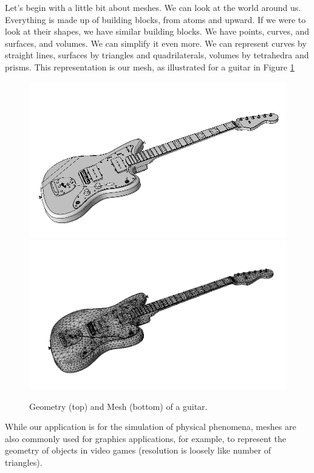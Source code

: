 \documentclass[12pt]{article}
\begin{document}
\maketitle

Let's begin with a little bit about meshes. We can look at the world around us.
Everything is made up of building blocks, from atoms and upward. If we were to
look at their shapes, we have similar building blocks. We have points, curves,
and surfaces, and volumes. We can simplify it even more. We can represent curves
by straight lines, surfaces by triangles and quadrilaterals, volumes by
tetrahedra and prisms. This representation is our mesh, as illustrated for a
guitar in Figure \ref{fig:guitar}
\begin{figure}
\includegraphics[width=1.0\textwidth]{images/guitarCAD.png}\\\includegraphics[width=1.0\textwidth]{images/guitarMESH.png}
\caption{Geometry (top) and Mesh (bottom) of a guitar.}
\label{fig:guitar}
\end{figure}
While our application is for the simulation of physical phenomena, meshes are
also commonly used for graphics applications, for example, to represent the
geometry of objects in video games (resolution is loosely like number of
triangles).
\end{document}
